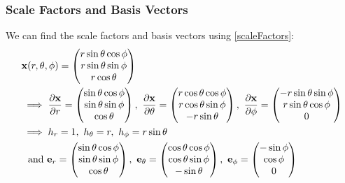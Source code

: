 \documentclass[../main.tex]{subfiles}
\begin{document}
\subsubsection{Scale Factors and Basis Vectors}
\label{scaleBasisSpherical}
We can find the scale factors and basis vectors using \cref{scaleFactors}:
\begin{align*}
  &\vec{x}(r, \theta, \phi) = \begin{pmatrix}
  r\sin \theta \cos \phi \\
  r\sin \theta \sin \phi \\
  r\cos \theta \\
  \end{pmatrix} \\
  &\implies
  \pderiv{\vec{x}}{r} = \begin{pmatrix}
  \sin \theta \cos \phi \\
  \sin \theta \sin \phi \\
  \cos \theta \\
  \end{pmatrix},\
  \pderiv{\vec{x}}{\theta} = \begin{pmatrix}
  r\cos \theta \cos \phi \\
  r\cos \theta \sin \phi \\
  -r\sin \theta \\
  \end{pmatrix},\ \pderiv{\vec{x}}{\phi} = \begin{pmatrix}
  -r \sin \theta \sin \phi \\
  r \sin \theta \cos \phi  \\
  0 \\
  \end{pmatrix} \\
  &\implies
  h_r = 1,\
  h_\theta = r,\
  h_\phi = r\sin\theta\\
  &\ \text{ and }
  \vec{e}_r = \begin{pmatrix}
  \sin \theta \cos \phi \\
  \sin \theta \sin \phi \\
  \cos \theta \\
  \end{pmatrix},\
  \vec{e}_\theta = \begin{pmatrix}
  \cos \theta \cos \phi \\
  \cos \theta \sin \phi \\
  -\sin \theta \\
  \end{pmatrix},\
  \vec{e}_\phi = \begin{pmatrix}
  -\sin \phi \\
  \cos \phi \\
  0 \\
  \end{pmatrix}
\end{align*}
\end{document}
